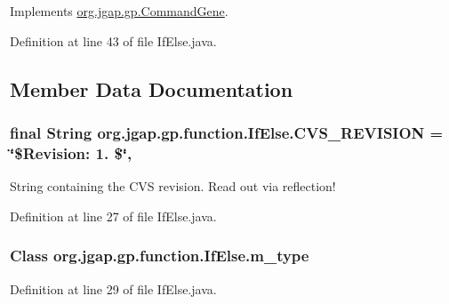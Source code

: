 Implements \hyperlink{classorg_1_1jgap_1_1gp_1_1_command_gene_a236141d99059da808afe7a9217e411c7}{org.\-jgap.\-gp.\-Command\-Gene}.



Definition at line 43 of file If\-Else.\-java.



\subsection{Member Data Documentation}
\hypertarget{classorg_1_1jgap_1_1gp_1_1function_1_1_if_else_a46cf1a482481c1804ec7e9d1d95eca5b}{
\subsubsection[{C\-V\-S\-\_\-\-R\-E\-V\-I\-S\-I\-O\-N}]{\setlength{\rightskip}{0pt plus 5cm}final String org.\-jgap.\-gp.\-function.\-If\-Else.\-C\-V\-S\-\_\-\-R\-E\-V\-I\-S\-I\-O\-N = \char`\"{}\$Revision\-: 1. \$\char`\"{}\hspace{0.3cm}{\ttfamily [static]}, {\ttfamily [private]}}}\label{classorg_1_1jgap_1_1gp_1_1function_1_1_if_else_a46cf1a482481c1804ec7e9d1d95eca5b}
String containing the C\-V\-S revision. Read out via reflection! 

Definition at line 27 of file If\-Else.\-java.

\hypertarget{classorg_1_1jgap_1_1gp_1_1function_1_1_if_else_a12a1c2dd6d89630b9d08393d3e1503aa}{
\subsubsection[{m\-\_\-type}]{\setlength{\rightskip}{0pt plus 5cm}Class org.\-jgap.\-gp.\-function.\-If\-Else.\-m\-\_\-type\hspace{0.3cm}{\ttfamily [private]}}}\label{classorg_1_1jgap_1_1gp_1_1function_1_1_if_else_a12a1c2dd6d89630b9d08393d3e1503aa}


Definition at line 29 of file If\-Else.\-java.




